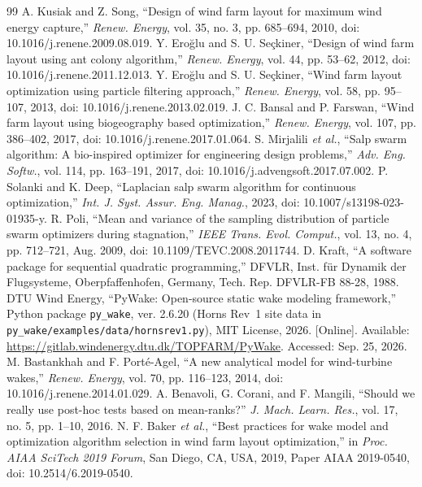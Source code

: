 \documentclass[10pt]{article}
\begin{document}
\begin{thebibliography}{99}
 A. Kusiak and Z. Song, ``Design of wind farm layout for maximum wind energy capture,'' \textit{Renew. Energy}, vol. 35, no. 3, pp. 685--694, 2010, doi: 10.1016/j.renene.2009.08.019.
 Y. Ero\u{g}lu and S. U. Se\c{c}kiner, ``Design of wind farm layout using ant colony algorithm,'' \textit{Renew. Energy}, vol. 44, pp. 53--62, 2012, doi: 10.1016/j.renene.2011.12.013.
 Y. Ero\u{g}lu and S. U. Se\c{c}kiner, ``Wind farm layout optimization using particle filtering approach,'' \textit{Renew. Energy}, vol. 58, pp. 95--107, 2013, doi: 10.1016/j.renene.2013.02.019.
 J. C. Bansal and P. Farswan, ``Wind farm layout using biogeography based optimization,'' \textit{Renew. Energy}, vol. 107, pp. 386--402, 2017, doi: 10.1016/j.renene.2017.01.064.
 S. Mirjalili \textit{et al.}, ``Salp swarm algorithm: A bio-inspired optimizer for engineering design problems,'' \textit{Adv. Eng. Softw.}, vol. 114, pp. 163--191, 2017, doi: 10.1016/j.advengsoft.2017.07.002.
 P. Solanki and K. Deep, ``Laplacian salp swarm algorithm for continuous optimization,'' \textit{Int. J. Syst. Assur. Eng. Manag.}, 2023, doi: 10.1007/s13198-023-01935-y.
 R. Poli, ``Mean and variance of the sampling distribution of particle swarm optimizers during stagnation,'' \textit{IEEE Trans. Evol. Comput.}, vol. 13, no. 4, pp. 712--721, Aug. 2009, doi: 10.1109/TEVC.2008.2011744.
 D. Kraft, ``A software package for sequential quadratic programming,'' DFVLR, Inst. f\"ur Dynamik der Flugsysteme, Oberpfaffenhofen, Germany, Tech. Rep. DFVLR-FB 88-28, 1988.
 DTU Wind Energy, ``PyWake: Open-source static wake modeling framework,'' Python package \texttt{py\_wake}, ver. 2.6.20 (Horns Rev~1 site data in \texttt{py\_wake/examples/data/hornsrev1.py}), MIT License, 2026. [Online]. Available: \url{https://gitlab.windenergy.dtu.dk/TOPFARM/PyWake}. Accessed: Sep. 25, 2026.
 M. Bastankhah and F. Port\'e-Agel, ``A new analytical model for wind-turbine wakes,'' \textit{Renew. Energy}, vol. 70, pp. 116--123, 2014, doi: 10.1016/j.renene.2014.01.029.
 A. Benavoli, G. Corani, and F. Mangili, ``Should we really use post-hoc tests based on mean-ranks?'' \textit{J. Mach. Learn. Res.}, vol. 17, no. 5, pp. 1--10, 2016.
 N. F. Baker \textit{et al.}, ``Best practices for wake model and optimization algorithm selection in wind farm layout optimization,'' in \textit{Proc. AIAA SciTech 2019 Forum}, San Diego, CA, USA, 2019, Paper AIAA 2019-0540, doi: 10.2514/6.2019-0540.

\end{thebibliography}
\end{document}
